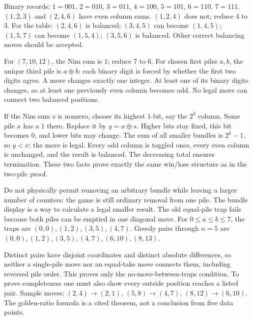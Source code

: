 \documentclass[11pt]{article}
\begin{document}
\newpage

Binary records: $1=001$, $2=010$, $3=011$, $4=100$, $5=101$, $6=110$, $7=111$. $(1,2,3)$ and $(2,4,6)$ have even column sums. $(1,2,4)$ does not; reduce 4 to 3. For the table: $(2,4,6)$ is balanced; $(3,4,5)$ can become $(1,4,5)$; $(1,5,7)$ can become $(1,5,4)$; $(3,5,6)$ is balanced. Other correct balancing moves should be accepted.

For $(7,10,12)$, the Nim sum is 1; reduce 7 to 6. For chosen first piles $a,b$, the unique third pile is $a\mathbin{\oplus}b$: each binary digit is forced by whether the first two digits agree.
A move changes exactly one integer. At least one of its binary digits changes, so at least one previously even column becomes odd. No legal move can connect two balanced positions.

If the Nim sum $s$ is nonzero, choose its highest 1-bit, say the $2^k$ column. Some pile $x$ has a 1 there. Replace it by $y=x\mathbin{\oplus}s$. Higher bits stay fixed, this bit becomes 0, and lower bits may change. The sum of all smaller bundles is $2^k-1$, so $y<x$: the move is legal. Every odd column is toggled once, every even column is unchanged, and the result is balanced. The decreasing total ensures termination. These two facts prove exactly the same win/lose structure as in the two-pile proof.

Do not physically permit removing an arbitrary bundle while leaving a larger number of counters: the game is still ordinary removal from one pile. The bundle display is a way to calculate a legal smaller result.
The old equal-pile trap fails because both piles can be emptied in one diagonal move. For $0\le a\le b\le7$, the traps are $(0,0),(1,2),(3,5),(4,7)$. Greedy pairs through $n=5$ are $(0,0),(1,2),(3,5),(4,7),(6,10),(8,13)$.

Distinct pairs have disjoint coordinates and distinct absolute differences, so neither a single-pile move nor an equal-take move connects them, including reversed pile order. This proves only the no-move-between-traps condition. To prove completeness one must also show every outside position reaches a listed pair. Sample moves: $(2,4)\to(2,1)$, $(5,8)\to(4,7)$, $(8,12)\to(6,10)$. The golden-ratio formula is a cited theorem, not a conclusion from five data points.

\newpage
\end{document}
